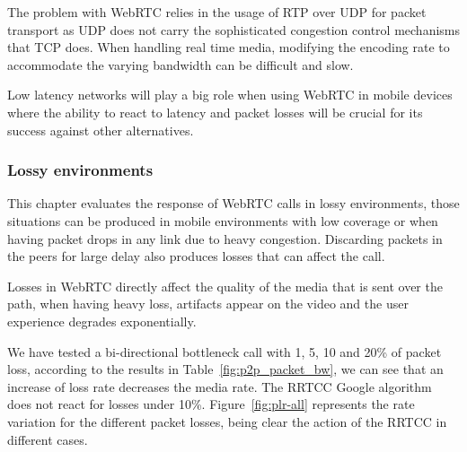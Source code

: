 %

The problem with WebRTC relies in the usage of RTP over UDP for packet transport as UDP does not carry the sophisticated congestion control mechanisms that TCP does. When handling real time media, modifying the encoding rate to accommodate the varying bandwidth can be difficult and slow.

Low latency networks will play a big role when using WebRTC in mobile devices where the ability to react to latency and packet losses will be crucial for its success against other alternatives.

\subsubsection{Lossy environments}

This chapter evaluates the response of WebRTC calls in lossy environments, those situations can be produced in mobile environments with low coverage or when having packet drops in any link due to heavy congestion. Discarding packets in the peers for large delay also produces losses that can affect the call.

Losses in WebRTC directly affect the quality of the media that is sent over the path, when having heavy loss, artifacts appear on the video and the user experience degrades exponentially.

We have tested a bi-directional bottleneck call with 1, 5, 10 and 20\% of packet loss, according to the results in Table~\ref{fig:p2p_packet_bw}, we can see that an increase of loss rate decreases the media rate. The RRTCC Google algorithm~\cite{alvestrandCongestion2012} does not react for losses under 10\%. Figure~\ref{fig:plr-all} represents the rate variation for the different packet losses, being clear the action of the RRTCC in different cases.

